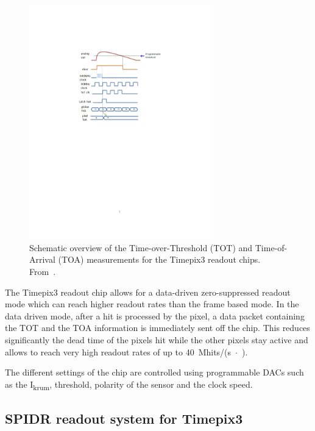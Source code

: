 \begin{figure}[htbp]
  \centering \includegraphics[width=0.7\textwidth, trim = 50mm 140mm
    60mm 50mm, clip]{figures/Calibration/TOT_TOA_explanation.pdf}
  \caption{Schematic overview of the Time-over-Threshold (TOT) and
    Time-of-Arrival (TOA) measurements for the Timepix3 readout
    chips. From~\cite{Timepix3Poikela}.}
  \label{fig:TOT_TOA_concept}
\end{figure}

The Timepix3 readout chip allows for a data-driven zero-suppressed
readout mode which can reach higher readout rates than the frame based
mode. In the data driven mode, after a hit is processed by the pixel,
a data packet containing the TOT and the TOA information is
immediately sent off the chip. This reduces significantly the dead
time of the pixels hit while the other pixels stay active and allows
to reach very high readout rates of up to
40~Mhits/(s~$\cdot$~\cmsquared).

The different settings of the chip are controlled using programmable
DACs such as the I\textsubscript{krum}, threshold, polarity of the
sensor and the clock speed.



\subsection{SPIDR readout system for Timepix3}
\label{sec:TimepixReadout}

